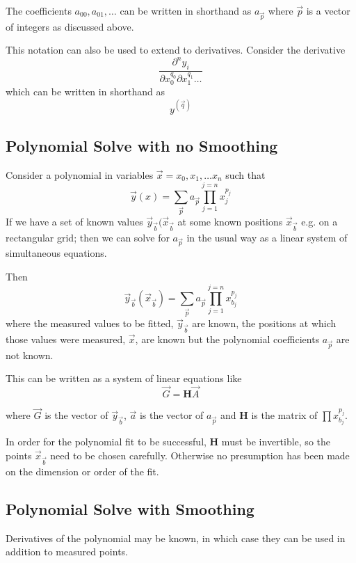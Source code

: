 \documentclass{article}
\begin{document}
The coefficients $a_{00}, a_{01}, \ldots$ can be written in shorthand as 
$a_{\vec{p}}$ where $\vec{p}$ is a vector of integers as discussed above.

This notation can also be used to extend to derivatives. Consider the derivative
\begin{equation}
\frac{\partial^ny_i}{\partial x_0^{q_0} \partial x_1^{q_1} \ldots}
\end{equation}
which can be written in shorthand as 
\begin{equation}
y^{(\vec{q})}
\end{equation}

\subsection{Polynomial Solve with no Smoothing}
Consider a polynomial in variables $\vec{x} = x_0, x_1, \ldots x_n$ such that
\begin{equation}
\vec{y}(x) = \sum_{\vec{p}} a_{\vec{p}} \prod^{j=n}_{j=1} x_j^{p_j}
\end{equation}
If we have a set of known values $\vec{y}_{\vec{b}}(\vec{x}_{\vec{b}}$ at some
known positions $\vec{x}_{\vec{b}}$ e.g. on a rectangular grid; then we can 
solve for $a_{\vec{p}}$ in the usual way as a linear system of simultaneous 
equations.

Then
\begin{equation}
\vec{y}_{\vec{b}}(\vec{x}_{\vec{b}}) = \sum_{\vec{p}} a_{\vec{p}} \prod^{j=n}_{j=1} x_{b_j}^{p_j}
\end{equation}
where the measured values to be fitted, $\vec{y}_{\vec{b}}$ are known, the
positions at which those values were measured, $\vec{x}$, are known but the
polynomial coefficients $a_{\vec{p}}$ are not known.

This can be written as a system of linear equations like
\begin{equation}
\vec{G} = \mathbf{H} \vec{A}
\end{equation}

where $\vec{G}$ is the vector of $\vec{y}_{\vec{b}}$, $\vec{a}$ is the vector of
$a_{\vec{p}}$ and $\mathbf{H}$ is the matrix of $\prod x_{b_j}^{p_j}$.

In order for the polynomial fit to be successful, $\mathbf{H}$ must be invertible,
so the points $\vec{x}_{\vec{b}}$ need to be chosen carefully. Otherwise no 
presumption has been made on the dimension or order of the fit.

\subsection{Polynomial Solve with Smoothing}
Derivatives of the polynomial may be known, in which case they can be used in
addition to measured points.
\end{document}
